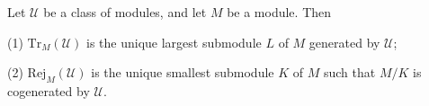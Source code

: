 Let $\mathcal{U}$ be a class of modules, and let $M$ be a module. Then

(1) $\mathrm{Tr}_M(\mathcal{U})$ is the unique largest submodule $L$ of $M$ generated by $\mathcal{U}$;

(2) $\mathrm{Rej}_M(\mathcal{U})$ is the unique smallest submodule $K$ of $M$ such that $M/K$ is cogenerated by $\mathcal{U}$.
